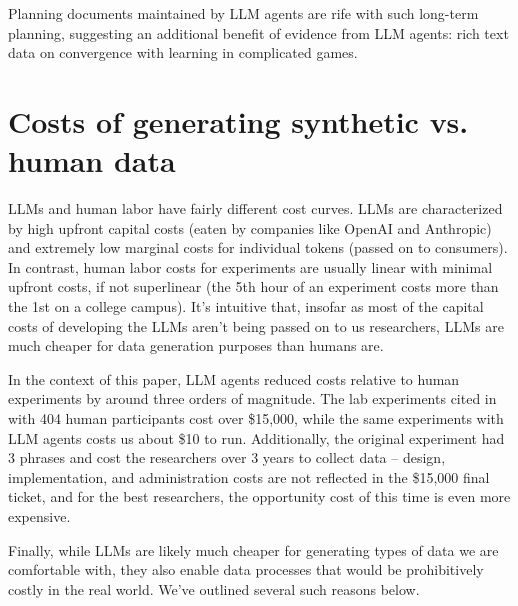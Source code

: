 \documentclass{article} %
\begin{document}
Planning documents maintained by LLM agents are rife with such long-term planning, suggesting an additional benefit of evidence from LLM agents: rich text data on convergence with learning in complicated games.


\section{Costs of generating synthetic vs. human data}
LLMs and human labor have fairly different cost curves. 
LLMs are characterized by high upfront capital costs (eaten by companies like OpenAI and Anthropic) and extremely low marginal costs for individual tokens (passed on to consumers). 
In contrast, human labor costs for experiments are usually linear with minimal upfront costs, if not superlinear (the 5th hour of an experiment costs more than the 1st on a college campus). 
It's intuitive that, insofar as most of the capital costs of developing the LLMs aren't being passed on to us researchers, LLMs are much cheaper for data generation purposes than humans are.

In the context of this paper, LLM agents reduced costs relative to human experiments by around three orders of magnitude. 
The lab experiments cited in \cite{li2017obviously} with 404 human participants cost over \$15,000, while the same experiments with LLM agents costs us about \$10 to run. 
Additionally, the original experiment had 3 phrases and cost the researchers over 3 years to collect data -- design, implementation, and administration costs are not reflected in the \$15,000 final ticket, and for the best researchers, the opportunity cost of this time is even more expensive.

Finally, while LLMs are likely much cheaper for generating types of data we are comfortable with, they also enable data processes that would be prohibitively costly in the real world. 
We've outlined several such reasons below.
\end{document}
